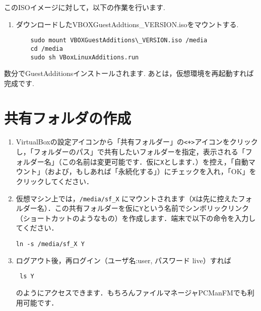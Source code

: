 \documentclass[a4j]{ltjsarticle}
\begin{document}
このISOイメージに対して，以下の作業を行います. 
\begin{enumerate}
 \item ダウンロードしたVBOXGuestAddtions\_VERSION.isoをマウントする. 
       \begin{lstlisting}
	sudo mount VBOXGuestAdditions\_VERSION.iso /media
	cd /media
	sudo sh VBoxLinuxAdditions.run
       \end{lstlisting}
\end{enumerate}
数分でGuestAdditionsインストールされます. 
あとは，仮想環境を再起動すれば完成です. 

\section{共有フォルダの作成}
\begin{enumerate}
 \item VirtualBoxの設定アイコンから「共有フォルダー」の\verb|<+>|アイコンをクリックし，「フォルダーのパス」で共有したいフォルダーを指定，表示される「フォルダー名」（この名前は変更可能です．仮に\verb|X|とします．）を控え，「自動マウント」（および，もしあれば「永続化する」）にチェックを入れ，「OK」をクリックしてください．
 \item 仮想マシン上では，\verb|/media/sf_X| にマウントされます（\verb|X|は先に控えたフォルダー名）．この共有フォルダーを仮に\verb|Y|という名前でシンボリックリンク（ショートカットのようなもの）を作成します．端末で以下の命令を入力してください．
\begin{lstlisting}
ln -s /media/sf_X Y
\end{lstlisting}
\item ログアウト後，再ログイン（ユーザ名:user, パスワード live）すれば
\begin{lstlisting}
 ls Y
\end{lstlisting}
のようにアクセスできます．もちろんファイルマネージャPCManFMでも利用可能です．
\end{enumerate}

\end{document}
